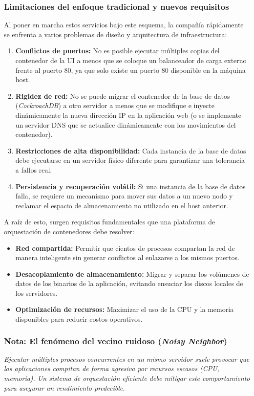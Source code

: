 \subsubsection{Limitaciones del enfoque tradicional y nuevos requisitos}
Al poner en marcha estos servicios bajo este esquema, la compañía rápidamente se enfrenta a varios problemas de diseño y arquitectura de infraestructura:
\begin{enumerate}
    \item \textbf{Conflictos de puertos:} No es posible ejecutar múltiples copias del contenedor de la UI a menos que se coloque un balanceador de carga externo frente al puerto 80, ya que solo existe un puerto 80 disponible en la máquina host.
    \item \textbf{Rigidez de red:} No se puede migrar el contenedor de la base de datos (\textit{CockroachDB}) a otro servidor a menos que se modifique e inyecte dinámicamente la nueva dirección IP en la aplicación web (o se implemente un servidor DNS que se actualice dinámicamente con los movimientos del contenedor).
    \item \textbf{Restricciones de alta disponibilidad:} Cada instancia de la base de datos debe ejecutarse en un servidor físico diferente para garantizar una tolerancia a fallos real.
    \item \textbf{Persistencia y recuperación volátil:} Si una instancia de la base de datos falla, se requiere un mecanismo para mover sus datos a un nuevo nodo y reclamar el espacio de almacenamiento no utilizado en el host anterior.
\end{enumerate}

A raíz de esto, surgen requisitos fundamentales que una plataforma de orquestación de contenedores debe resolver:
\begin{itemize}
    \item \textbf{Red compartida:} Permitir que cientos de procesos compartan la red de manera inteligente sin generar conflictos al enlazarse a los mismos puertos.
    \item \textbf{Desacoplamiento de almacenamiento:} Migrar y separar los volúmenes de datos de los binarios de la aplicación, evitando ensuciar los discos locales de los servidores.
    \item \textbf{Optimización de recursos:} Maximizar el uso de la CPU y la memoria disponibles para reducir costos operativos.
\end{itemize}

\subsubsection*{Nota: El fenómeno del vecino ruidoso (\textit{Noisy Neighbor})}
\textit{Ejecutar múltiples procesos concurrentes en un mismo servidor suele provocar que las aplicaciones compitan de forma agresiva por recursos escasos (CPU, memoria). Un sistema de orquestación eficiente debe mitigar este comportamiento para asegurar un rendimiento predecible.}


